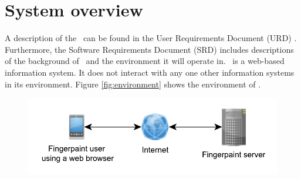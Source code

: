 \chapter{System overview}
\label{chap:systoverview}
A description of the \applicationname\ can be found in the User Requirements Document (URD) \cite{urd}. Furthermore, the Software Requirements Document (SRD) \cite{srd} includes descriptions of the background of \projectname\ and the environment it will operate in.
\projectname\ is a web-based information system. It does not interact with any one other information systems in its environment. Figure \ref{fig:environment} shows the environment of \projectname.

\begin{figure}[h!]
\begin{center}
\includegraphics[keepaspectratio=true,width=450pt]{Environment.pdf}
\end{center}
\end{figure}

